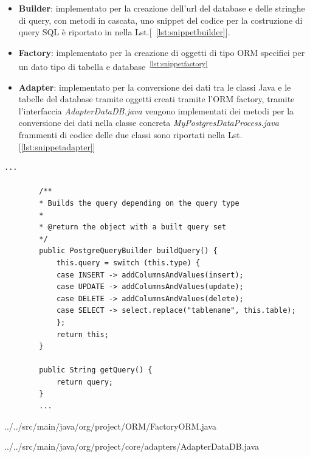 \documentclass[
    10pt, %
    a4paper, %
    oneside, %
    headinclude,footinclude, %
    BCOR5mm, %
]{scrartcl}
\begin{document}
    \begin{itemize}
        \item \textbf{Builder}: implementato per la creazione dell'url del database e delle stringhe di query, con
        metodi in cascata, uno snippet del codice per la costruzione di query SQL è riportato in nella
        Lst.[~\ref{lst:snippetbuilder}].
        \item \textbf{Factory}: implementato per la creazione di oggetti di tipo ORM specifici per un dato tipo
        di tabella e database~\textsuperscript{\ref{lst:snippetfactory}}
        \item \textbf{Adapter}: implementato per la conversione dei dati tra le classi Java e le tabelle del
        database tramite oggetti creati tramite l'ORM factory, tramite l'interfaccia \textit{AdapterDataDB.java} vengono
        implementati dei metodi per la conversione dei dati nella classe concreta \textit{MyPostgresDataProcess.java}
        frammenti di codice delle due classi sono riportati nella Lst.[\ref{lst:snippetadapter}]

    \end{itemize}

    \begin{lstlisting}[caption={Frammento di codice da PostgreQueryBuilder.java}, label={lst:snippetbuilder}]
        ...

        /**
        * Builds the query depending on the query type
        *
        * @return the object with a built query set
        */
        public PostgreQueryBuilder buildQuery() {
            this.query = switch (this.type) {
            case INSERT -> addColumnsAndValues(insert);
            case UPDATE -> addColumnsAndValues(update);
            case DELETE -> addColumnsAndValues(delete);
            case SELECT -> select.replace("tablename", this.table);
            };
            return this;
        }

        public String getQuery() {
            return query;
        }
        ...
    \end{lstlisting}
    \newpage
    
    {../../src/main/java/org/project/ORM/FactoryORM.java}
    
    {../../src/main/java/org/project/core/adapters/AdapterDataDB.java}
\end{document}
